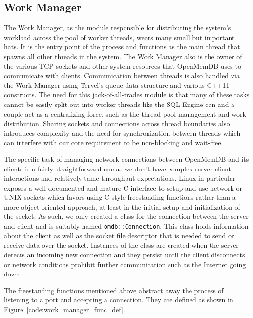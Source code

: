\documentclass[letterpaper, 12pt]{article}
\newcommand{\inlinecode}[1]{\colorbox{codegrey}{\lstinline[language=C++]{#1}}}
\begin{document}
  \subsection{Work Manager}
  The Work Manager, as the module responsible for distributing the system's workload across the
  pool of worker threads, wears many small but important hats. It is the entry point of the
  process and functions as the main thread that spawns all other threads in the system. The Work
  Manager also is the owner of the various TCP sockets and other system resources that OpenMemDB
  uses to communicate with clients. Communication between threads is also handled via the
  Work Manager using Tervel's queue data structure and various C++11 constructs. The need for this
  jack-of-all-trades module is that many of these tasks cannot be easily split out into
  worker threads like the SQL Engine can and a couple act as a centralizing force, such as the
  thread pool management and work distribution. Sharing sockets and connections across thread
  boundaries also introduces complexity and the need for synchronization between threads which
  can interfere with our core requirement to be non-blocking and wait-free.
  \par\vspace{\baselineskip}
  The specific task of managing network connections between OpenMemDB and its clients is a fairly
  straightforward one as we don't have complex server-client interactions and relatively tame
  throughput expectations. Linux in particular exposes a well-documented and mature C interface
  to setup and use network or UNIX sockets which favors using C-style freestanding functions
  rather than a more object-oriented approach, at least in the initial setup and initialization
  of the socket. As such, we only created a class for the connection between the server and client
  and is suitably named \inlinecode{omdb::Connection}. This class holds
  information about the client as well as the socket file descriptor that is needed to send
  or receive data over the socket. Instances of the class are created when the server detects an
  incoming new connection and they persist until the client disconnects or network conditions
  prohibit further communication such as the Internet going down.
  \par\vspace{\baselineskip}
  The freestanding functions mentioned above abstract away the process of listening to a port
  and accepting a connection. They are defined as shown in Figure~\ref{code:work_manager_func_def}.
\end{document}
